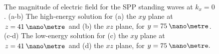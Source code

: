 \begin{figure}
	\begin{center}
		\\	
	\end{center}	
\caption[The magnitude of electric field for the SPP standing waves at $k_x=0$.]{The magnitude of electric field for the SPP standing waves at $k_x=0$. (a-b) The high-energy solution for (a) the $xy$ plane at $z=41\:\nano\metre$ and (b) the $xz$ plane, for $y=75\:\nano\metre$. (c-d) The low-energy solution for (c) the $xy$ plane at $z=41\:\nano\metre$ and (d) the $xz$ plane, for $y=75\:\nano\metre.$ \label{fig:zzbandgapfieldskgkg}}
\end{figure}

